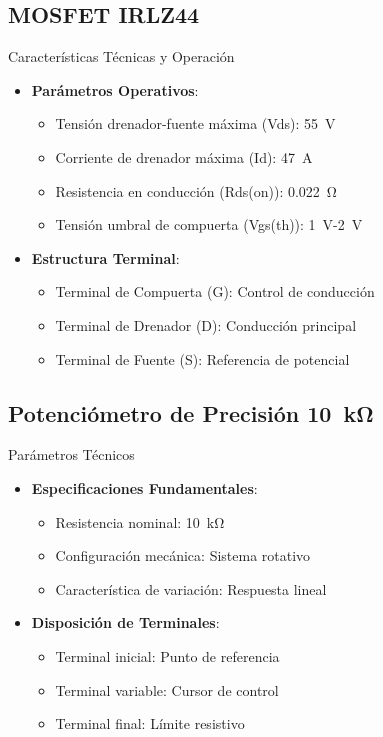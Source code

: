 \subsection{MOSFET IRLZ44}
\begin{componentBox}{Características Técnicas y Operación \citep{infineon2020irlz44}}
	\begin{itemize}[leftmargin=*,itemsep=1pt,parsep=1pt]
		\item \textbf{Parámetros Operativos}:
		\begin{itemize}[itemsep=0pt,parsep=0pt]
			\item Tensión drenador-fuente máxima (Vds): \SI{55}{\volt}
			\item Corriente de drenador máxima (Id): \SI{47}{\ampere}
			\item Resistencia en conducción (Rds(on)): \SI{0.022}{\ohm}
			\item Tensión umbral de compuerta (Vgs(th)): \SI{1}{\volt}-\SI{2}{\volt}
		\end{itemize}
		\item \textbf{Estructura Terminal}:
		\begin{itemize}[itemsep=0pt,parsep=0pt]
			\item Terminal de Compuerta (G): Control de conducción
			\item Terminal de Drenador (D): Conducción principal
			\item Terminal de Fuente (S): Referencia de potencial
		\end{itemize}
	\end{itemize}
\end{componentBox}

\subsection{Potenciómetro de Precisión \SI{10}{\kilo\ohm}}
\begin{componentBox}{Parámetros Técnicos \citep{horowitz2015art}}
	\begin{itemize}[leftmargin=*,itemsep=1pt,parsep=1pt]
		\item \textbf{Especificaciones Fundamentales}:
		\begin{itemize}[itemsep=0pt,parsep=0pt]
			\item Resistencia nominal: \SI{10}{\kilo\ohm}
			\item Configuración mecánica: Sistema rotativo
			\item Característica de variación: Respuesta lineal
		\end{itemize}
		\item \textbf{Disposición de Terminales}:
		\begin{itemize}[itemsep=0pt,parsep=0pt]
			\item Terminal inicial: Punto de referencia
			\item Terminal variable: Cursor de control
			\item Terminal final: Límite resistivo
		\end{itemize}
	\end{itemize}
\end{componentBox}

